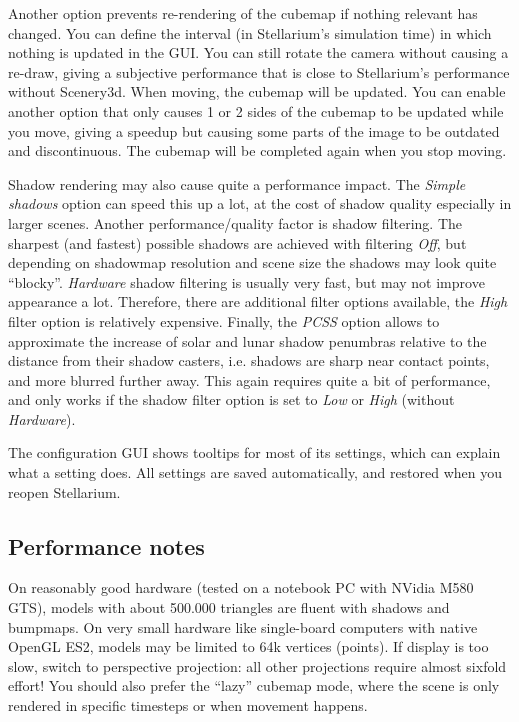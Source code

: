 \documentclass[a4paper]{article}
\begin{document}
Another option prevents re-rendering of the cubemap if nothing relevant has
changed. You can define the interval (in Stellarium's simulation time) in which
nothing is updated in the GUI. You can still rotate the camera without causing a
re-draw, giving a subjective performance that is close to Stellarium's
performance without Scenery3d. When moving, the cubemap will be updated. You can
enable another option that only causes 1 or 2 sides of the cubemap to be updated
while you move, giving a speedup but causing some parts of the image to be
outdated and discontinuous. The cubemap will be completed again when you stop
moving.

Shadow rendering may also cause quite a performance impact. The \emph{Simple
shadows} option can speed this up a lot, at the cost of shadow quality
especially in larger scenes. Another performance/quality factor is shadow
filtering. The sharpest (and fastest) possible shadows are achieved with
filtering \emph{Off}, but depending on shadowmap resolution and scene size the
shadows may look quite ``blocky''. \emph{Hardware} shadow filtering is usually
very fast, but may not improve appearance a lot. Therefore, there are additional
filter options available, the \emph{High} filter option is relatively expensive.
Finally, the \emph{PCSS} option allows to approximate the increase of solar and lunar shadow
penumbras relative to the distance from their shadow casters, i.e. shadows are
sharp near contact points, and more blurred further away. This again requires
quite a bit of performance, and only works if the shadow filter option is set to
\emph{Low} or \emph{High} (without \emph{Hardware}).

The configuration GUI shows tooltips for most of its settings, which can explain
what a setting does. All settings are saved automatically, and restored when you
reopen Stellarium.


\subsection{Performance notes}
\label{sec:Performance}

On reasonably good hardware 
(tested on a notebook PC with NVidia M580 GTS), models with about
500.000 triangles are fluent with shadows and bumpmaps.  On very small
hardware like single-board computers with native OpenGL ES2, models
may be limited to 64k vertices (points).  If display is too slow,
switch to perspective projection: all other projections require almost
sixfold effort!  You should also prefer the ``lazy'' cubemap mode, 
where the scene is only rendered in specific timesteps or
when movement happens.  
\end{document}
